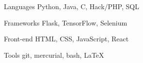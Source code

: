 

\begin{cvskills}


  \cvskill
    {Languages} %
    {Python, Java, C, Hack/PHP, SQL} %

  \cvskill
    {Frameworks} %
    {Flask, TensorFlow, Selenium} %

  \cvskill
    {Front-end} %
    {HTML, CSS, JavaScript, React} %

  \cvskill
    {Tools} %
    {git, mercurial, bash, \LaTeX} %

\end{cvskills}
